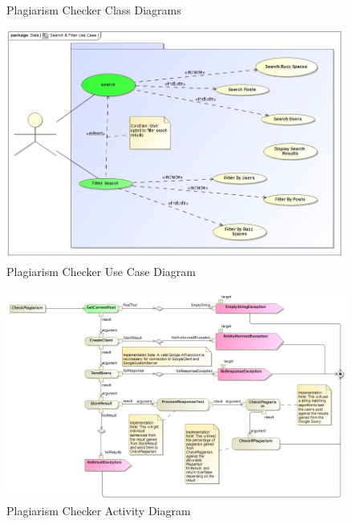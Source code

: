 \documentclass[11pt]{article}
\begin{document}
\begin{enumerate}
\begin{itemize}
\begin{figure}[H]
    					\caption{Plagiarism Checker Class Diagrams}
				\end{figure}
				\begin{figure}[H]
		    			\includegraphics[scale=0.4]{UseCase.jpg}
					\caption{Plagiarism Checker Use Case Diagram}
				\end{figure}
				\begin{figure}[H]
    					\includegraphics[scale=0.4]{Activity.jpg}
					\caption{Plagiarism Checker Activity Diagram}
				\end{figure}
	  	\end{itemize}


\end{enumerate}
\end{document}
